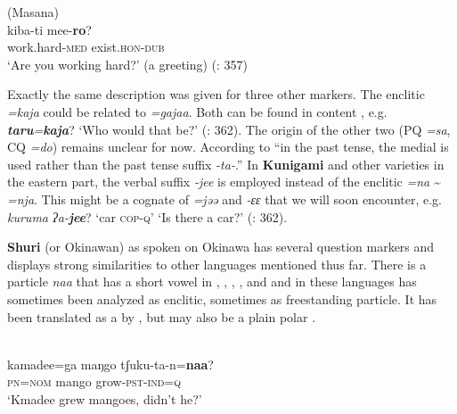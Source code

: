 \ea%
    \label{ex:japa:24}
     (Masana)\\
    \gll kiba-ti      mee-\textbf{{ro}}?\\
    work.hard-\textsc{med}   exist.\textsc{hon}-\textsc{dub}\\
    \glt ‘Are you working hard?’ (a greeting) (\citealt{vanderLubbeTokunaga2015}: 357)
    \z

Exactly the same description was given for three other markers. The enclitic \textit{=kaja} could be related to  \textit{=gajaa}. Both can be found in content , e.g. \textbf{\textit{taru}}\textit{=}\textbf{\textit{kaja}}? ‘Who would that be?’ (\citealt{vanderLubbeTokunaga2015}: 362). The origin of the other two (PQ \textit{=sa}, CQ \textit{=do}) remains unclear for now. According to \citet[361]{vanderLubbeTokunaga2015} “in the past tense, the medial  is used rather than the past tense suffix \textit{-ta-}.” In \textbf{Kunigami} and other varieties in the eastern part, the verbal suffix \textit{-jee} is employed instead of the enclitic \textit{=na} {\textasciitilde} \textit{=nja}. This might be a cognate of  \textit{=jəə} and  \textit{-ɛɛ} that we will soon encounter, e.g. \textit{kuruma ʔa-}\textbf{\textit{jee}}? ‘car \textsc{cop}-\textsc{q}’ ‘Is there a car?’ (\citealt{vanderLubbeTokunaga2015}: 362).

\textbf{Shuri} (or Okinawan) as spoken on Okinawa has several question markers and displays strong similarities to other languages mentioned thus far. There is a particle \textit{naa} that has a short vowel in , , , , and  and in these languages has sometimes been analyzed as enclitic, sometimes as freestanding particle. It has been translated as a  by \citet{Miyara2015}, but may also be a plain polar .

\ea%
    \label{ex:japa:25}
    \\
    \gll kamadee=ga  maŋgo  tʃuku-ta-n=\textbf{{naa}}?\\
    \textsc{pn}=\textsc{nom}  mango  grow-\textsc{pst}-\textsc{ind}=\textsc{q}\\
    \glt ‘Kmadee grew mangoes, didn’t he?’ \citep[394]{Miyara2015}
    \z

